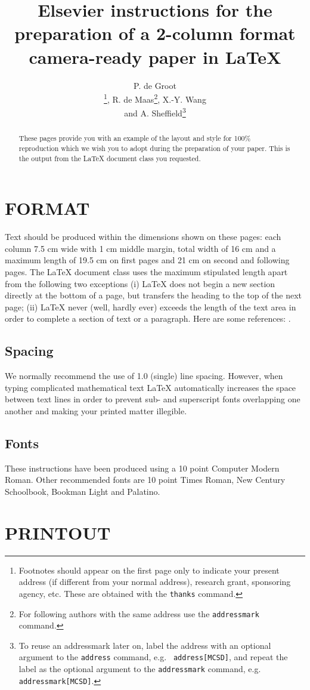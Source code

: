 \documentclass[fleqn,twoside]{article}
\title{Elsevier instructions for the preparation of a
       2-column format camera-ready paper in \LaTeX}
\author{P. de Groot\address[MCSD]{Mathematics and Computer Science Section, 
        Elsevier Science B.V., \\ 
        P.O. Box 103, 1000 AC Amsterdam, The Netherlands}%
        \thanks{Footnotes should appear on the first page only to
                indicate your present address (if different from your
                normal address), research grant, sponsoring agency, etc.
                These are obtained with the {\tt\ttbs thanks} command.},
        R. de Maas\addressmark\thanks{For following authors with the same
                address use the {\tt\ttbs addressmark} command.},
        X.-Y. Wang\address{Economics Department, University of Winchester, \\
        2 Finch Road, Winchester, Hampshire P3L T19, United Kingdom}
        and
        A. Sheffield\addressmark[MCSD]\thanks{To reuse an addressmark
                later on, label the address with an optional argument to the
                {\tt \ttbs address} command, e.g. {\tt\ttbs
                address[MCSD]}, and repeat the label
                as the optional argument to the {\tt\ttbs addressmark}
                command, e.g. {\tt\ttbs addressmark[MCSD]}.}}
\begin{document}
\begin{abstract}
These pages provide you with an example of the layout and style for
100\% reproduction which we wish you to adopt during the preparation of
your paper. This is the output from the \LaTeX{} document class you
requested.
\vspace{1pc}
\end{abstract}

\maketitle

\section{FORMAT}

Text should be produced within the dimensions shown on these pages:
each column 7.5 cm wide with 1 cm middle margin, total width of 16 cm
and a maximum length of 19.5 cm on first pages and 21 cm on second and
following pages. The \LaTeX{} document class uses the maximum stipulated
length apart from the following two exceptions (i) \LaTeX{} does not
begin a new section directly at the bottom of a page, but transfers the
heading to the top of the next page; (ii) \LaTeX{} never (well, hardly
ever) exceeds the length of the text area in order to complete a
section of text or a paragraph. Here are some references:
\cite{Scho70,Mazu84}.

\subsection{Spacing}

We normally recommend the use of 1.0 (single) line spacing. However,
when typing complicated mathematical text \LaTeX{} automatically
increases the space between text lines in order to prevent sub- and
superscript fonts overlapping one another and making your printed
matter illegible.

\subsection{Fonts}

These instructions have been produced using a 10 point Computer Modern
Roman. Other recommended fonts are 10 point Times Roman, New Century
Schoolbook, Bookman Light and Palatino.

\section{PRINTOUT}
\end{document}
